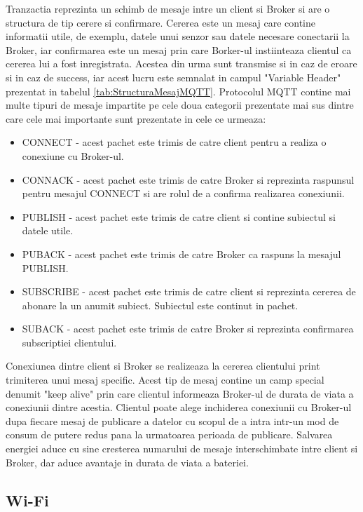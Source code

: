 Tranzactia reprezinta un schimb de mesaje intre un client si Broker si are o structura de tip cerere si confirmare. Cererea este un mesaj care contine informatii 
utile, de exemplu, datele unui senzor sau datele necesare conectarii la Broker, iar confirmarea este un mesaj prin care Borker-ul instiinteaza clientul ca cererea 
lui a fost inregistrata. Acestea din urma sunt transmise si in caz de eroare si in caz de success, iar acest lucru este semnalat in campul "Variable Header" 
prezentat in tabelul \ref{tab:StructuraMesajMQTT}. Protocolul MQTT contine mai multe tipuri de mesaje impartite pe cele doua categorii prezentate mai sus dintre 
care cele mai importante sunt prezentate in cele ce urmeaza:
\begin{itemize}
    \item CONNECT - acest pachet este trimis de catre client pentru a realiza o conexiune cu Broker-ul.
    \item CONNACK - acest pachet este trimis de catre Broker si reprezinta raspunsul pentru mesajul CONNECT si are rolul de a confirma realizarea conexiunii.
    \item PUBLISH - acest pachet este trimis de catre client si contine subiectul si datele utile.
    \item PUBACK - acest pachet este trimis de catre Broker ca raspuns la mesajul PUBLISH.
    \item SUBSCRIBE - acest pachet este trimis de catre client si reprezinta cererea de abonare la un anumit subiect. Subiectul este continut in pachet.
    \item SUBACK - acest pachet este trimis de catre Broker si reprezinta confirmarea subscriptiei clientului.
\end{itemize}

Conexiunea dintre client si Broker se realizeaza la cererea clientului print trimiterea unui mesaj specific. Acest tip de mesaj contine un camp special 
denumit "keep alive" prin care clientul informeaza Broker-ul de durata de viata a conexiunii dintre acestia. Clientul poate alege inchiderea conexiunii 
cu Broker-ul dupa fiecare mesaj de publicare a datelor cu scopul de a intra intr-un mod de consum de putere redus pana la urmatoarea perioada de 
publicare. Salvarea energiei aduce cu sine cresterea numarului de mesaje interschimbate intre client si Broker, dar aduce avantaje in durata de viata 
a bateriei. 

\subsection{Wi-Fi}\label{sec:wifi}
